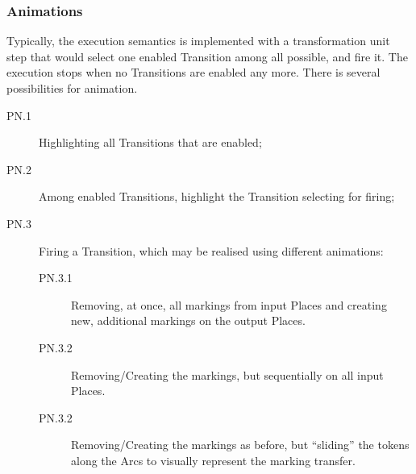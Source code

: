 \subsubsection{Animations}
\label{sec:Examples:PN:Animations}

Typically, the execution semantics is implemented with a transformation unit 
\textsf{step} that would select one enabled \textsf{Transition} among all possible,
and \textsf{fire} it. The execution stops when no \textsf{Transition}s are enabled
any more. There is several possibilities for animation.

\begin{description}
   \item[PN.1] Highlighting all \textsf{Transition}s that are enabled;
   \item[PN.2] Among enabled \textsf{Transition}s, highlight the \textsf{Transition}
   selecting for firing;
   \item[PN.3] Firing a \textsf{Transition}, which may be realised using 
   different animations:
   \begin{description}
      \item[PN.3.1] Removing, at once, all markings from input \textsf{Place}s 
      and creating new, additional markings on the output \textsf{Place}s.
      \item[PN.3.2] Removing/Creating the markings, but sequentially on all input
      \textsf{Place}s.
      \item[PN.3.2] Removing/Creating the markings as before, but ``sliding'' the
      tokens along the \textsf{Arc}s to visually represent the marking transfer.
   \end{description}
\end{description}

